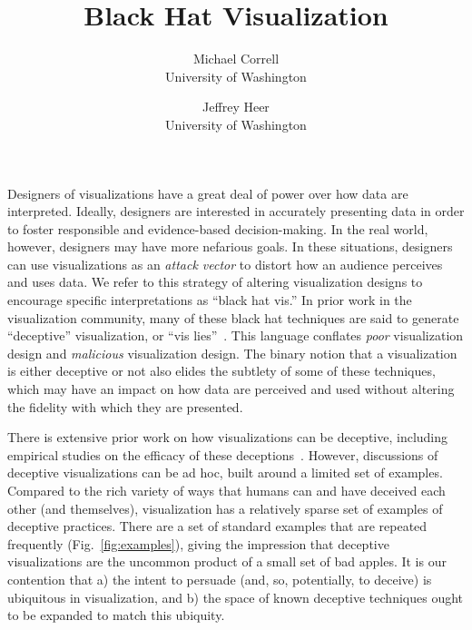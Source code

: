\documentclass{vgtc}                          %
\title{Black Hat Visualization}
\author{Michael Correll\\ %
        \scriptsize University of Washington %
\and Jeffrey Heer\\ %
     \scriptsize University of Washington %
}
\begin{document}


\maketitle

Designers of visualizations have a great deal of power over how data are interpreted. Ideally, designers are interested in accurately presenting data in order to foster responsible and evidence-based decision-making. In the real world, however, designers may have more nefarious goals. In these situations, designers can use visualizations as an \emph{attack vector} to distort how an audience perceives and uses data. We refer to this strategy of altering visualization designs to encourage specific interpretations as ``black hat vis.'' In prior work in the visualization community, many of these black hat techniques are said to generate ``deceptive'' visualization, or ``vis lies''~\cite{vislies2016}. This language conflates \emph{poor} visualization design and \emph{malicious} visualization design. The binary notion that a visualization is either deceptive or not also elides the subtlety of some of these techniques, which may have an impact on how data are perceived and used without altering the fidelity with which they are presented.
 
There is extensive prior work on how visualizations can be deceptive, including empirical studies on the efficacy of these deceptions~\cite{pandey2015deceptive}. However, discussions of deceptive visualizations can be ad hoc, built around a limited set of examples. Compared to the rich variety of ways that humans can and have deceived each other (and themselves), visualization has a relatively sparse set of examples of deceptive practices. There are a set of standard examples that are repeated frequently  (Fig.~\ref{fig:examples}), giving the impression that deceptive visualizations are the uncommon product of a small set of bad apples. It is our contention that a) the intent to persuade (and, so, potentially, to deceive) is ubiquitous in visualization, and b) the space of known deceptive techniques ought to be expanded to match this ubiquity.
\end{document}
